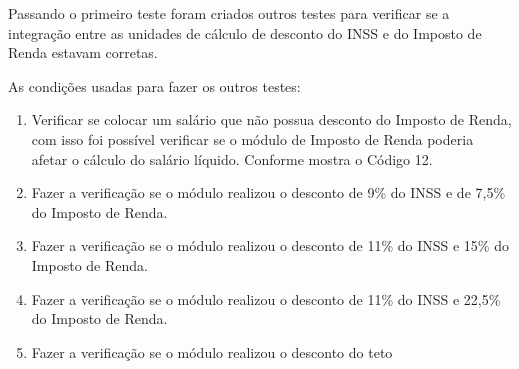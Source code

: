 \par Passando o primeiro teste foram criados outros testes para verificar se a integração entre as unidades de cálculo de desconto do INSS e do Imposto de Renda estavam corretas.


  \par As condições usadas para fazer os outros testes:
\begin{enumerate}

 \item Verificar se colocar um salário que não possua desconto do Imposto de Renda, com isso foi possível verificar se o módulo de Imposto de Renda poderia afetar o cálculo do salário líquido. Conforme mostra o Código 12.
 
  \item Fazer a verificação se o módulo realizou o desconto de 9\% do INSS e de 7,5\% do Imposto de Renda.
  \item Fazer a verificação se o módulo realizou o desconto de 11\% do INSS e 15\% do Imposto de Renda.
  \item Fazer a verificação se o módulo realizou o desconto de 11\% do INSS e 22,5\% do Imposto de Renda.
  \item Fazer a verificação se o módulo realizou o desconto do teto \end{enumerate}
  
\newpage
 
